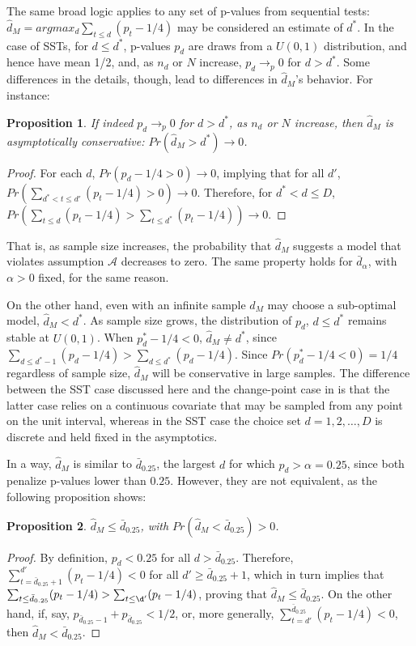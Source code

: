 \documentclass[12pt]{article}\usepackage[]{graphicx}\usepackage[]{color}
\newcommand{\dalphaU}{\bar{d}_\alpha}
\newcommand{\dstar}{d^*}
\newcommand{\dhatU}{\bar{d}}
\newcommand{\dhatm}{\hat{d}_M}
\newtheorem{prop}{Proposition}
\begin{document}
The same broad logic applies to any set of p-values from sequential tests:
$\dhatm=argmax_d \sum_{t\le d} (p_t-1/4)$ may be considered an
estimate of $\dstar$.
In the case of SSTs, for $d\le \dstar$, p-values $p_d$ are draws from
a $U(0,1)$ distribution, and hence have mean 1/2, and, as $n_d$ or $N$
increase, $p_d \rightarrow_p 0$ for $d>\dstar$.
Some differences in the details, though, lead to differences in
$\dhatm$'s behavior.
For instance:
\begin{prop}
If indeed $p_d\rightarrow_p 0$ for $d>\dstar$, as $n_d$ or $N$
increase, then $\dhatm$ is asymptotically conservative:
$Pr(\dhatm>\dstar)\rightarrow 0$.
\end{prop}
\begin{proof}
For each $d$, $Pr(p_d -1/4>0)\rightarrow 0$, implying that for all $d'$, $Pr(\sum_{\dstar <t\le d'}
(p_t-1/4)>0)\rightarrow 0$.
Therefore, for $\dstar<d\le D$, $Pr(\sum_{t\le d} (p_t-1/4)> \sum_{t\le
  \dstar} (p_t-1/4))\rightarrow 0$.
\end{proof}
That is, as sample size increases, the probability that $\dhatm$
suggests a model that violates assumption $\mathcal{A}$ decreases to
zero.
The same property holds for $\dalphaU$, with $\alpha>0$ fixed, for
the same reason.

On the other hand, even with an infinite sample $\dhatm$ may choose a
sub-optimal model, $\dhatm<\dstar$.
As sample size grows, the distribution of $p_d$, $d\le \dstar$ remains
stable at $U(0,1)$.
When $p_\dstar-1/4<0$, $\dhatm \neq \dstar$, since $\sum_{d\le
  \dstar-1} (p_d-1/4)>\sum_{d\le \dstar} (p_d-1/4)$.
Since $Pr(p_\dstar-1/4<0)=1/4$ regardless of sample size, $\dhatm$
will be conservative in large samples.
The difference between the SST case discussed here and the
change-point case in \citet{mallik} is that the latter case relies on
a continuous covariate that may be sampled from any point on the unit
interval, whereas in the SST case the choice set $d=1,2,\dots,D$ is
discrete and held fixed in the asymptotics.

In a way, $\dhatm$ is similar to $\dhatU_{0.25}$, the largest $d$ for
which $p_d>\alpha=0.25$, since both penalize p-values lower than
$0.25$.
However, they are not equivalent, as the following proposition shows:
\begin{prop}
$\dhatm \le \dhatU_{0.25}$, with $Pr(\dhatm < \dhatU_{0.25})>0$.
\end{prop}
\begin{proof}
By definition, $p_d<0.25$ for all $d>\dhatU_{0.25}$. Therefore,
$\sum_{t=\dhatU_{0.25}+1}^{d'}(p_t-1/4)<0$ for all $d'\ge
\dhatU_{0.25}+1$, which in turn implies that $\sum_{t\le
  \dhatU_{0.25}}(p_t-1/4)>\sum_{t\le\d'}(p_t-1/4)$, proving that
$\dhatm\le \dhatU_{0.25}$. On the other hand, if, say,
$p_{\dhatU_{0.25}-1}+p_{\dhatU_{0.25}}<1/2$, or, more generally,
$\sum_{t=d'}^{\dhatU_{0.25}}(p_t-1/4)<0$, then $\dhatm<\dhatU_{0.25}$.
\end{proof}
\end{document}
